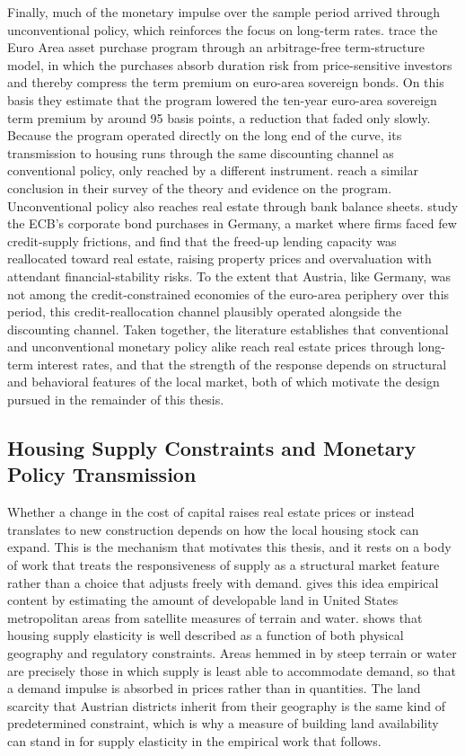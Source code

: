 \documentclass[a4paper,12pt, headsepline]{scrartcl}
\numberwithin{equation}{section}
\begin{document}
Finally, much of the monetary impulse over the sample period arrived through unconventional policy, which reinforces the focus on long-term rates. \citet{eser2019} trace the Euro Area asset purchase program through an arbitrage-free term-structure model, in which the purchases absorb duration risk from price-sensitive investors and thereby compress the term premium on euro-area sovereign bonds. On this basis they estimate that the program lowered the ten-year euro-area sovereign term premium by around 95 basis points, a reduction that faded only slowly. Because the program operated directly on the long end of the curve, its transmission to housing runs through the same discounting channel as conventional policy, only reached by a different instrument. \citet{benigno2023} reach a similar conclusion in their survey of the theory and evidence on the program. Unconventional policy also reaches real estate through bank balance sheets. \citet{berg2024} study the ECB's corporate bond purchases in Germany, a market where firms faced few credit-supply frictions, and find that the freed-up lending capacity was reallocated toward real estate, raising property prices and overvaluation with attendant financial-stability risks. To the extent that Austria, like Germany, was not among the credit-constrained economies of the euro-area periphery over this period, this credit-reallocation channel plausibly operated alongside the discounting channel. Taken together, the literature establishes that conventional and unconventional monetary policy alike reach real estate prices through long-term interest rates, and that the strength of the response depends on structural and behavioral features of the local market, both of which motivate the design pursued in the remainder of this thesis.

\subsection{Housing Supply Constraints and Monetary Policy Transmission}\label{subsec:supply-transmission}

Whether a change in the cost of capital raises real estate prices or instead translates to new construction depends on how the local housing stock can expand. This is the mechanism that motivates this thesis, and it rests on a body of work that treats the responsiveness of supply as a structural market feature rather than a choice that adjusts freely with demand. \citet{saiz2010} gives this idea empirical content by estimating the amount of developable land in United States metropolitan areas from satellite measures of terrain and water. \citet{saiz2010} shows that housing supply elasticity is well described as a function of both physical geography and regulatory constraints. Areas hemmed in by steep terrain or water are precisely those in which supply is least able to accommodate demand, so that a demand impulse is absorbed in prices rather than in quantities. The land scarcity that Austrian districts inherit from their geography is the same kind of predetermined constraint, which is why a measure of building land availability can stand in for supply elasticity in the empirical work that follows.
\end{document}
